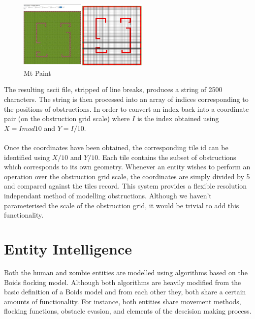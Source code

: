 \documentclass[10pt, a4paper, conference, compsocconf]{IEEEtran}
\begin{document}
\begin{figure}[h]
  \centering
  \includegraphics[width=2.5in]{../img/mt_paint.png}
\caption{Mt Paint}
    \label{fig:mtpaint}
\end{figure}

The resulting ascii file, stripped of line breaks, produces a string of 2500 characters. The string is then processed into an array of indices corresponding to the positions of obstructions. In order to convert an index back into a coordinate pair (on the obstruction grid scale) where \(I\) is the index obtained using \(X = I mod 10\) and \(Y = I / 10\).\\
\\
Once the coordinates have been obtained, the corresponding tile id can be identified using \(X / 10\) and \(Y / 10\). Each tile contains the subset of obstructions which corresponds to its own geometry. Whenever an entity wishes to perform an operation over the obstruction grid scale, the coordinates are simply divided by 5 and compared against the tiles record. This system provides a flexible resolution independant method of modelling obstructions. Although we haven't parameterised the scale of the obstruction grid, it would be trivial to add this functionality.

\section{Entity Intelligence \label{behaviours}}
Both the human and zombie entities are modelled using algorithms based on the Boids flocking model. Although both algorithms are heavily modified from the basic definition of a Boids model and from each other they, both share a certain amounts of functionality. For instance, both entities share movement methods, flocking functions, obstacle evasion, and elements of the descision making process.\\
\end{document}
